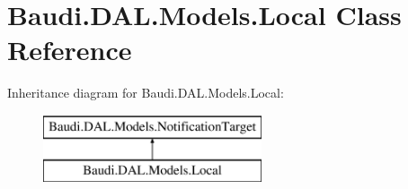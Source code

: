 \hypertarget{class_baudi_1_1_d_a_l_1_1_models_1_1_local}{}\section{Baudi.\+D\+A\+L.\+Models.\+Local Class Reference}
\label{class_baudi_1_1_d_a_l_1_1_models_1_1_local}
Inheritance diagram for Baudi.\+D\+A\+L.\+Models.\+Local\+:\begin{figure}[H]
\begin{center}
\leavevmode
\includegraphics[height=2.000000cm]{class_baudi_1_1_d_a_l_1_1_models_1_1_local}
\end{center}
\end{figure}

